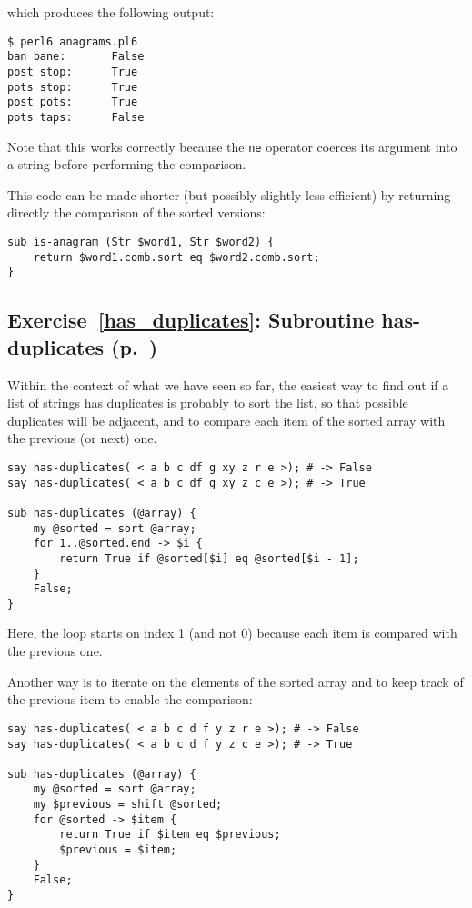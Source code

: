 {which produces the following output:
\begin{verbatim}
$ perl6 anagrams.pl6
ban bane:       False
post stop:      True
pots stop:      True
post pots:      True
pots taps:      False
\end{verbatim}

Note that this works correctly because the {\tt ne} 
operator coerces its argument into a string before 
performing the comparison.

This code can be made shorter (but possibly slightly less 
efficient) by returning directly the comparison of 
the sorted versions:

\begin{verbatim}
sub is-anagram (Str $word1, Str $word2) {
    return $word1.comb.sort eq $word2.comb.sort;
}
\end{verbatim}


\subsection{Exercise~\ref{has_duplicates}: Subroutine has-duplicates (p.~\pageref{has_duplicates})}
\label{sol_has_duplicates}

Within the context of what we have seen so far, the 
easiest way to find out if a list of strings has 
duplicates is probably to sort the list, so that 
possible duplicates will be adjacent, and to 
compare each item of the sorted array with the 
previous (or next) one.

\begin{verbatim}
say has-duplicates( < a b c df g xy z r e >); # -> False
say has-duplicates( < a b c df g xy z c e >); # -> True

sub has-duplicates (@array) {
    my @sorted = sort @array;
    for 1..@sorted.end -> $i {
        return True if @sorted[$i] eq @sorted[$i - 1];
    }
    False;
}
\end{verbatim}
%

Here, the loop starts on index 1 (and not 0) because 
each item is compared with the previous one.

Another way is to iterate on the elements of the sorted 
array and to keep track of the previous item to enable 
the comparison:

\begin{verbatim}
say has-duplicates( < a b c d f y z r e >); # -> False
say has-duplicates( < a b c d f y z c e >); # -> True

sub has-duplicates (@array) {
    my @sorted = sort @array;
    my $previous = shift @sorted;
    for @sorted -> $item {
        return True if $item eq $previous;
        $previous = $item;
    }
    False;
}
\end{verbatim}
%

}
